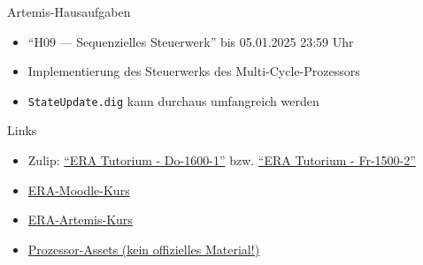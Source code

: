 \documentclass[
  german,            %
  aspectratio=169,    %
]{tumbeamer}
\begin{document}
\begin{frame}[c, fragile]{Artemis-Hausaufgaben}{}
	\begin{itemize}
		\item \enquote{H09 --- Sequenzielles Steuerwerk} bis 05.01.2025 23:59 Uhr
		\item Implementierung des Steuerwerks des Multi-Cycle-Prozessors
		\item \texttt{StateUpdate.dig} kann durchaus umfangreich werden
	\end{itemize}
\end{frame}

\begin{frame}[c, fragile]{Links}{}
	\begin{itemize}
		\item Zulip: \href{https://zulip.in.tum.de/#narrow/stream/2661-ERA-Tutorium---Do-1600-1}{\enquote{ERA Tutorium - Do-1600-1}}
		      bzw. \href{https://zulip.in.tum.de/#narrow/stream/2675-ERA-Tutorium---Fr-1500-2 }{\enquote{ERA Tutorium - Fr-1500-2}}
		\item \href{https://www.moodle.tum.de/course/view.php?id=100633}{ERA-Moodle-Kurs}
		\item \href{https://artemis.in.tum.de/courses/401}{ERA-Artemis-Kurs}
		\item \href{https://courses.edx.org/assets/courseware/v1/f06a2dc0c856f60ec0711e9f5e1c98cf/asset-v1:HarveyMuddX+ENGR85B+1T2023+type@asset+block/FinalReferences.pdf}{Prozessor-Assets (kein offizielles Material!)}
	\end{itemize}
\end{frame}

\maketitle
\end{document}
